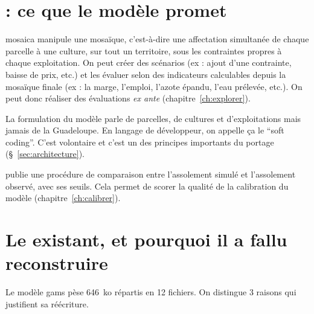 \section{ : ce que le modèle promet}
\label{sec:mosaica}

\gls{mosaica} manipule une mosaïque, c'est-à-dire une affectation simultanée de chaque parcelle
à une culture, sur tout un territoire, sous les contraintes propres à chaque exploitation. On
peut créer des scénarios (ex : ajout d'une contrainte, baisse de prix, etc.) et les évaluer
selon des indicateurs calculables depuis la mosaïque finale (ex : la marge, l'emploi, l'azote
épandu, l'eau prélevée, etc.). On peut donc réaliser des évaluations \emph{ex ante}
(chapitre~\ref{ch:explorer}).

La formulation du modèle parle de parcelles, de cultures et d'exploitations mais jamais de la
Guadeloupe. En langage de développeur, on appelle ça le \enquote{soft coding}. C'est volontaire
et c'est un des principes importants du portage (§~\ref{sec:architecture}).

\textcite[§~2.6]{chopin2015} publie une procédure de comparaison entre l'assolement simulé et
l'assolement observé, avec ses seuils. Cela permet de scorer la qualité de la calibration du
modèle (chapitre~\ref{ch:calibrer}).

\section{Le  existant, et pourquoi il a fallu reconstruire}
\label{sec:gams}

Le modèle \gls{gams} pèse \num{646}~ko répartis en \num{12} fichiers. On distingue
\num{3} raisons qui justifient sa réécriture.


